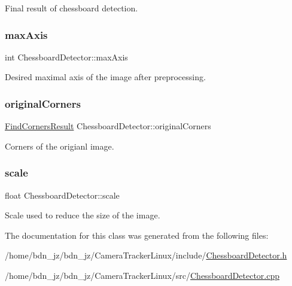 Final result of chessboard detection. \mbox{\label{class_chessboard_detector_a5d5dc8aaf92fb5ed7e73892ad678ec96}} 
\subsubsection{\texorpdfstring{max\+Axis}{maxAxis}}
{\footnotesize\ttfamily int Chessboard\+Detector\+::max\+Axis\hspace{0.3cm}{\ttfamily [private]}}

Desired maximal axis of the image after preprocessing. \mbox{\label{class_chessboard_detector_a726c92a071aa8c46d67f33c7a0760d54}} 
\subsubsection{\texorpdfstring{original\+Corners}{originalCorners}}
{\footnotesize\ttfamily \hyperlink{struct_find_corners_result}{Find\+Corners\+Result} Chessboard\+Detector\+::original\+Corners\hspace{0.3cm}{\ttfamily [private]}}

Corners of the origianl image. \mbox{\label{class_chessboard_detector_ac5594a662e5f276b5f0e5450b883efa0}} 
\subsubsection{\texorpdfstring{scale}{scale}}
{\footnotesize\ttfamily float Chessboard\+Detector\+::scale\hspace{0.3cm}{\ttfamily [private]}}

Scale used to reduce the size of the image. 

The documentation for this class was generated from the following files\+:\begin{DoxyCompactItemize}
\item 
/home/bdn\+\_\+jz/bdn\+\_\+jz/\+Camera\+Tracker\+Linux/include/\hyperlink{_chessboard_detector_8h}{Chessboard\+Detector.\+h}\item 
/home/bdn\+\_\+jz/bdn\+\_\+jz/\+Camera\+Tracker\+Linux/src/\hyperlink{_chessboard_detector_8cpp}{Chessboard\+Detector.\+cpp}\end{DoxyCompactItemize}
